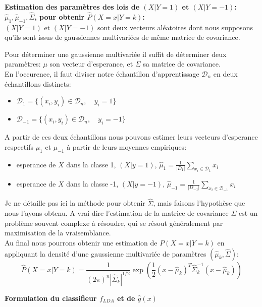 \documentclass[a4paper]{article}
\theoremstyle{plain}
\begin{document}
\textbf{Estimation des paramètres des lois de $(X|Y=1)$ et $(X|Y=-1)$: $\hat \mu_1, \hat \mu_{-1}, \hat \Sigma$, pour obtenir $\hat P(X=x|Y=k)$:}\\

$(X|Y=1)$ et $(X|Y=-1)$ sont deux vecteurs aléatoires dont nous supposons qu'ils sont issus de gaussiennes multivariées de même matrice de covariance.

Pour déterminer une gaussienne multivariée il suffit de déterminer deux paramètres: $\mu$ son vecteur d'esperance, et $\Sigma$ sa matrice de covariance.\\

En l'occurence, il faut diviser notre échantillon d'apprentissage $\mathcal{D}_n$ en deux échantillons distincts: 
\begin{itemize}
\item $\mathcal{D}_1 = \{(x_i,y_i) \in \mathcal{D}_n, \quad y_i=1 \}$ 
\item $\mathcal{D}_{-1} = \{(x_i,y_i) \in \mathcal{D}_n, \quad y_i=-1 \}$
\end{itemize}

A partir de ces deux échantillons nous pouvons estimer leurs vecteurs d'esperance respectifs $\mu_1$ et $\mu_{-1}$ à partir de leurs moyennes empiriques:
\begin{itemize}
\item esperance de $X$ dans la classe 1, $(X|y=1)$, $\hat \mu_1 = \frac{1}{|{D}_1|} \sum_{x_i \in \mathcal{D}_1} x_i$
\item esperance de $X$ dans la classe -1, $(X|y=-1)$, $\hat \mu_{-1} = \frac{1}{|{D}_{-1}|} \sum_{x_i \in \mathcal{D}_{-1}}  x_i$
\end{itemize}

Je ne détaille pas ici la méthode pour obtenir $\hat \Sigma$, mais faisons l'hypothèse que nous l'ayons obtenu.
A vrai dire l'estimation de la matrice de covariance $\Sigma$ est un problème souvent complexe à résoudre, qui se résout généralement par maximisation de la vraisemblance.\\

Au final nous pourrons obtenir une estimation de $P(X=x|Y=k)$ en appliquant la densité d'une gaussienne multivariée de paramètres $(\hat \mu_k,\hat \Sigma)$: 
$$\hat P(X=x|Y=k)= \frac{1}{ (2 \pi)^n |\hat \Sigma_k|^{1/2} } \exp \left( \frac{1}{2}(x- \hat \mu_k)^T \hat \Sigma_k^{-1}(x-\hat \mu_k) \right) $$

\textbf{Formulation du classifieur  $f_{LDA}$ et de $\hat g(x)$}\\
\end{document}
